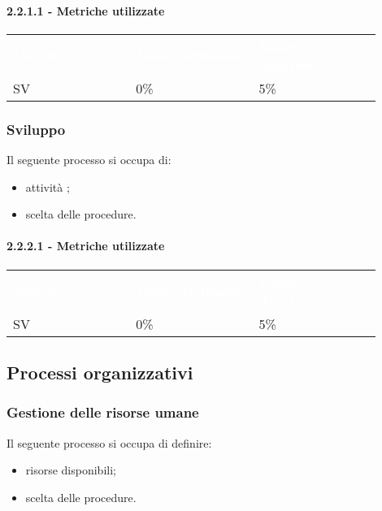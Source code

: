 \paragraph{2.2.1.1 - Metriche utilizzate}
{\renewcommand{\arraystretch}{1.5}
\begin{longtable}{p{0.30\linewidth}p{0.30\linewidth}p{0.30\linewidth}}
	\rowcolor[RGB]{33, 73, 50}
	\textcolor{white}{\textbf{Metrica}} & \textcolor{white}{\textbf{Valore Ottimale}} & \textcolor{white}{\textbf{Valore Accettato}}\\
    \rowcolor[RGB]{216, 235, 171}
    SV & 0\% & 5\%\\
\end{longtable}

\subsubsection{Sviluppo}
Il seguente processo si occupa di:
\begin{itemize}
    \item attività ;
    \item scelta delle procedure.
\end{itemize}
\paragraph{2.2.2.1 - Metriche utilizzate}
{\renewcommand{\arraystretch}{1.5}
\begin{longtable}{p{0.30\linewidth}p{0.30\linewidth}p{0.30\linewidth}}
	\rowcolor[RGB]{33, 73, 50}
	\textcolor{white}{\textbf{Metrica}} & \textcolor{white}{\textbf{Valore Ottimale}} & \textcolor{white}{\textbf{Valore Accettato}}\\
    \rowcolor[RGB]{216, 235, 171}
    SV & 0\% & 5\%\\
\end{longtable}

\subsection{Processi organizzativi}

\subsubsection{Gestione delle risorse umane}
Il seguente processo si occupa di definire:
\begin{itemize}
    \item risorse disponibili;
    \item scelta delle procedure.
\end{itemize}
}}
